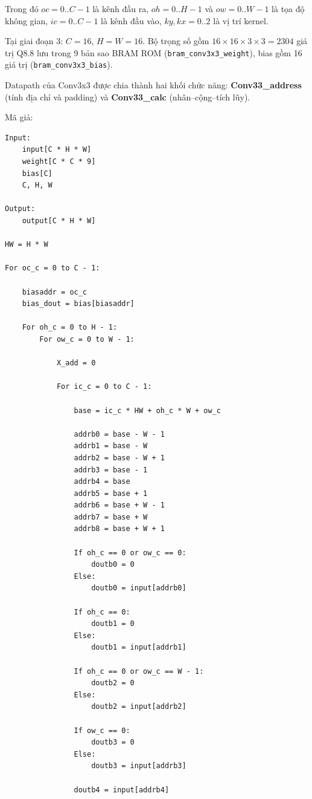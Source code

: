 \documentclass{uetgraduation}
\begin{document}
Trong đó $oc = 0..C{-}1$ là kênh đầu ra, $oh = 0..H{-}1$ và
$ow = 0..W{-}1$ là tọa độ không gian, $ic = 0..C{-}1$ là kênh đầu
vào, $ky, kx = 0..2$ là vị trí kernel.

Tại giai đoạn 3: $C = 16$, $H = W = 16$. Bộ trọng số gồm
$16 \times 16 \times 3 \times 3 = 2304$ giá trị Q8.8 lưu trong 9 bản
sao BRAM ROM (\texttt{bram\_conv3x3\_weight}), bias gồm 16 giá trị
(\texttt{bram\_conv3x3\_bias}).

Datapath của Conv3x3 được chia thành hai khối chức năng:
\textbf{Conv33\_address} (tính địa chỉ và padding) và
\textbf{Conv33\_calc} (nhân--cộng--tích lũy).

Mã giả:
\begin{Verbatim}[frame=single]
Input:
    input[C * H * W]
    weight[C * C * 9]
    bias[C]
    C, H, W

Output:
    output[C * H * W]

HW = H * W

For oc_c = 0 to C - 1:

    biasaddr = oc_c
    bias_dout = bias[biasaddr]

    For oh_c = 0 to H - 1:
        For ow_c = 0 to W - 1:

            X_add = 0

            For ic_c = 0 to C - 1:

                base = ic_c * HW + oh_c * W + ow_c

                addrb0 = base - W - 1
                addrb1 = base - W
                addrb2 = base - W + 1
                addrb3 = base - 1
                addrb4 = base
                addrb5 = base + 1
                addrb6 = base + W - 1
                addrb7 = base + W
                addrb8 = base + W + 1

                If oh_c == 0 or ow_c == 0:
                    doutb0 = 0
                Else:
                    doutb0 = input[addrb0]

                If oh_c == 0:
                    doutb1 = 0
                Else:
                    doutb1 = input[addrb1]

                If oh_c == 0 or ow_c == W - 1:
                    doutb2 = 0
                Else:
                    doutb2 = input[addrb2]

                If ow_c == 0:
                    doutb3 = 0
                Else:
                    doutb3 = input[addrb3]

                doutb4 = input[addrb4]


\end{Verbatim}
\end{document}
